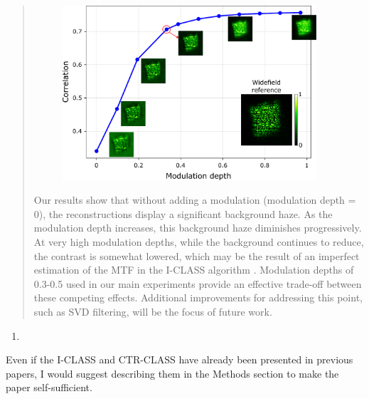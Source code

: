\documentclass[12pt]{article}
\newenvironment{solved_reviewercomment}
    {\begin{tcolorbox}[width=\linewidth,colback=gray!5,colframe=solved_commentcolor!50,title=Reviewer Comment,left=5pt,right=5pt]}
    {\end{tcolorbox}}
\newenvironment{ourresponse}
    {\begin{tcolorbox}[width=\linewidth,breakable,enhanced,colback=gray!5,colframe=responsecolor!50,title=Response,left=5pt,right=5pt]}
    {\end{tcolorbox}}
\begin{document}
\begin{ourresponse}
\begin{quote}
\begin{figure}[H]
    \centering
    \includegraphics[width=0.93\textwidth]{figures/Figure_S9.pdf}
    \renewcommand{\thefigure}{S9}
    \label{fig_S9}
\end{figure}


Our results show that without adding a modulation (modulation depth = 0), the reconstructions display a significant background haze. As the modulation depth increases, this background haze diminishes progressively. At very high modulation depths, while the background continues to reduce, the contrast is somewhat lowered, which may be the result of an imperfect estimation of the MTF in the I-CLASS algorithm \cite{weinberg2024noninvasive}.  Modulation depths of 0.3-0.5 used in our main experiments provide an effective trade-off between these competing effects. 
Additional improvements for addressing this point, such as SVD filtering, will be the focus of future work.

\end{quote}
\end{ourresponse}


    
\begin{enumerate}[label=\arabic*., resume]
\item \leavevmode
\end{enumerate}
\vspace{-1em}
\begin{solved_reviewercomment}
    Even if the I-CLASS and CTR-CLASS have already been presented in previous papers, I would suggest describing them in the Methods section to make the paper self-sufficient. 
\end{solved_reviewercomment}
\end{document}
